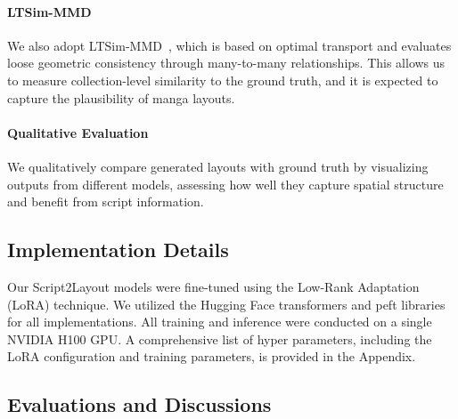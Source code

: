 \vspace{-0.5em}
\paragraph{LTSim-MMD} We also adopt LTSim-MMD~\cite{otani2024ltsim}, which is based on optimal transport and evaluates loose geometric consistency through many-to-many relationships. This allows us to measure collection-level similarity to the ground truth, and it is expected to capture the plausibility of manga layouts.

\vspace{-0.5em}
\paragraph{Qualitative Evaluation} We qualitatively compare generated layouts with ground truth by visualizing outputs from different models, assessing how well they capture spatial structure and benefit from script information.

\subsection{Implementation Details}
Our Script2Layout models were fine-tuned using the Low-Rank Adaptation (LoRA) technique. We utilized the Hugging Face transformers and peft libraries for all implementations. All training and inference were conducted on a single NVIDIA H100 GPU. A comprehensive list of hyper parameters, including the LoRA configuration and training parameters, is provided in the Appendix.

\subsection{Evaluations and Discussions}

